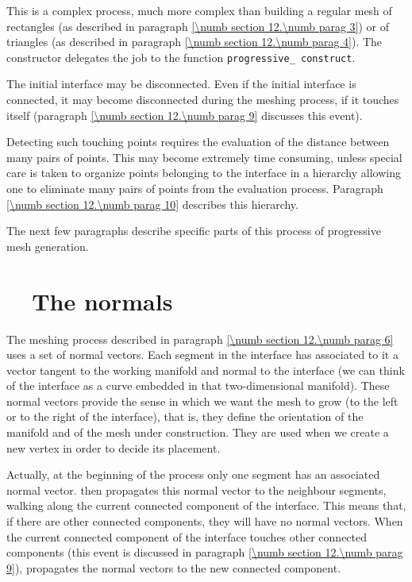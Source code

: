This is a complex process, much more complex than building a regular mesh of rectangles
(as described in paragraph \ref{\numb section 12.\numb parag 3}) or of triangles (as described
in paragraph \ref{\numb section 12.\numb parag 4}).
The constructor delegates the job to the function {\small\tt progressive\_\,construct}.

The initial interface may be disconnected.
Even if the initial interface is connected, it may become disconnected during the meshing
process, if it touches itself (paragraph \ref{\numb section 12.\numb parag 9}
discusses this event).

Detecting such touching points requires the evaluation of the distance between many pairs of points.
This may become extremely time consuming, unless special care is taken to organize points
belonging to the interface in a hierarchy allowing one to eliminate many pairs of points
from the evaluation process.
Paragraph \ref{\numb section 12.\numb parag 10} describes this hierarchy.

The next few paragraphs describe specific parts of this process of progressive mesh generation.


\section{~~The normals}\label{\numb section 12.\numb parag 7}

The meshing process described in paragraph \ref{\numb section 12.\numb parag 6} uses a set of
normal vectors.
Each segment in the interface has associated to it
a vector tangent to the working manifold and normal to the interface (we can
think of the interface as a curve embedded in that two-dimensional manifold).
These normal vectors provide the sense in which we want the mesh to grow (to the left or to
the right of the interface), that is, they define the orientation of the manifold and of
the mesh under construction.
They are used when we create a new vertex in order to decide its placement.

Actually, at the beginning of the process only one segment has an associated normal vector.
{\ManiFEM} then propagates this normal vector to the neighbour segments, walking along
the current connected component of the interface.
This means that, if there are other connected components, they will have no normal vectors.
When the current connected component of the interface touches other connected components
(this event is discussed in paragraph \ref{\numb section 12.\numb parag 9}), {\maniFEM}
propagates the normal vectors to the new connected component.

